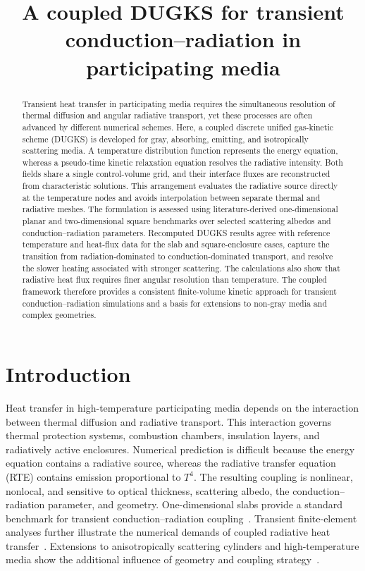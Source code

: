 \documentclass[a4paper,12pt]{ctexart}
\numberwithin{equation}{section}
\begin{document}
\title{A coupled DUGKS for transient conduction–radiation in participating media}

\begin{abstract}
Transient heat transfer in participating media requires the simultaneous resolution of thermal diffusion and angular radiative transport, yet these processes are often advanced by different numerical schemes. Here, a coupled discrete unified gas-kinetic scheme (DUGKS) is developed for gray, absorbing, emitting, and isotropically scattering media. A temperature distribution function represents the energy equation, whereas a pseudo-time kinetic relaxation equation resolves the radiative intensity. Both fields share a single control-volume grid, and their interface fluxes are reconstructed from characteristic solutions. This arrangement evaluates the radiative source directly at the temperature nodes and avoids interpolation between separate thermal and radiative meshes. The formulation is assessed using literature-derived one-dimensional planar and two-dimensional square benchmarks over selected scattering albedos and conduction--radiation parameters. Recomputed DUGKS results agree with reference temperature and heat-flux data for the slab and square-enclosure cases, capture the transition from radiation-dominated to conduction-dominated transport, and resolve the slower heating associated with stronger scattering. The calculations also show that radiative heat flux requires finer angular resolution than temperature. The coupled framework therefore provides a consistent finite-volume kinetic approach for transient conduction--radiation simulations and a basis for extensions to non-gray media and complex geometries.
\end{abstract}

\section{Introduction}
\label{sec:introduction}

Heat transfer in high-temperature participating media depends on the interaction between thermal diffusion and radiative transport. This interaction governs thermal protection systems, combustion chambers, insulation layers, and radiatively active enclosures. Numerical prediction is difficult because the energy equation contains a radiative source, whereas the radiative transfer equation (RTE) contains emission proportional to $T^4$. The resulting coupling is nonlinear, nonlocal, and sensitive to optical thickness, scattering albedo, the conduction--radiation parameter, and geometry. One-dimensional slabs provide a standard benchmark for transient conduction--radiation coupling~\cite{Talukdar2001}. Transient finite-element analyses further illustrate the numerical demands of coupled radiative heat transfer~\cite{Feng2021}. Extensions to anisotropically scattering cylinders and high-temperature media show the additional influence of geometry and coupling strategy~\cite{YasongSun2021,Zhu2024}.
\end{document}
